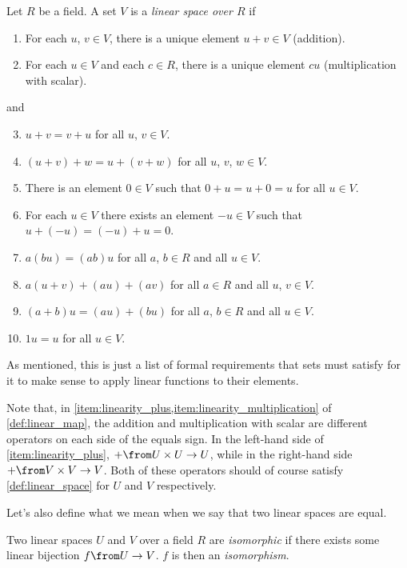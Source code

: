 \begin{definition}\label{def:linear_space}
	Let $R$ be a field.
	A set $V$ is a \emph{linear space over $R$} if
	\begin{enumerate}
		\item For each $u$, $v \in V$, there is a unique element $u + v \in V$ (addition).
		\item For each $u \in V$ and each $c \in R$, there is a unique element $c u$ (multiplication with scalar).
	\end{enumerate}
	and
	\begin{enumerate}
		\setcounter{enumi}{2}
		\item $u + v = v + u$ for all $u$, $v \in V$.
		\item $(u + v) + w = u + (v + w)$ for all $u$, $v$, $w \in V$.
		\item There is an element $\mathit 0 \in V$ such that $\mathit 0 + u = u + \mathit 0 = u$ for all $u \in V$.
		\item For each $u \in V$ there exists an element $-u \in V$ such that $u + (-u) = (-u) + u = \mathit 0$.
		\item $a(b u) = (a b) u$ for all $a$, $b \in R$ and all $u \in V$.
		\item $a (u + v) + (a u) + (a v)$ for all $a \in R$ and all $u$, $v \in V$.
		\item $(a + b) u = (a u) + (b u)$ for all $a$, $b \in R$ and all $u \in V$.
		\item $1 u = u$ for all $u \in V$.
	\end{enumerate}
\end{definition}

As mentioned, this is just a list of formal requirements that sets must satisfy for it to make sense to apply linear functions to their elements.

Note that, in \cref{item:linearity_plus,item:linearity_multiplication} of \cref{def:linear_map}, the addition and multiplication with scalar are different operators on each side of the equals sign.
In the left-hand side of \cref{item:linearity_plus}, $+ \from U \times U \to U$, while in the right-hand side $+ \from V \times V \to V$.
Both of these operators should of course satisfy \cref{def:linear_space} for $U$ and $V$ respectively.

\bigskip

Let's also define what we mean when we say that two linear spaces are equal.
\begin{definition}
	Two linear spaces $U$ and $V$ over a field $R$ are \emph{isomorphic} if there exists some linear bijection $f \from U \to V$.
	$f$ is then an \emph{isomorphism}.
\end{definition}

